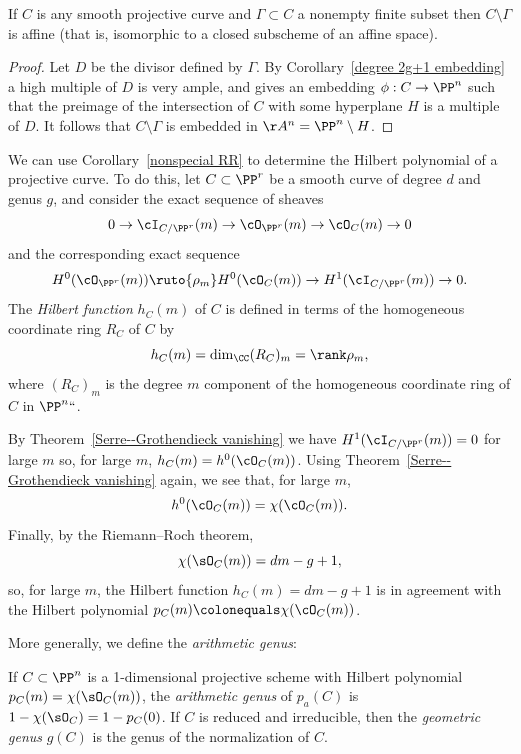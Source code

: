 \begin{corollary}
 If $C$ is any smooth projective curve and $\Gamma \subset C$ a nonempty finite subset then $C \setminus \Gamma$ is affine (that
 is, isomorphic to a closed subscheme of an affine space).
\end{corollary}

\begin{proof}
Let $D$ be the divisor defined by $\Gamma$. By Corollary~\ref{degree 2g+1 embedding} a high multiple of $D$ is very ample,
and gives an embedding $\phi: C\to \PP^n$ such that the preimage of the intersection of $C$ with some hyperplane $H$
is a multiple of $D$. It follows that $C\setminus \Gamma$ is embedded in $\AA^n = \PP^n\setminus H$.
\end{proof}
 
We can  use Corollary~\ref{nonspecial RR} to determine the Hilbert polynomial of a projective curve. To do this, let $C \subset \PP^r$ be a smooth curve of degree $d$ and genus $g$, and consider the exact sequence of sheaves
$$
0 \to \cI_{C/\PP^r}(m) \to \cO_{\PP^r}(m) \to \cO_C(m) \to 0
$$
and the corresponding exact sequence
$$
 H^0(\cO_{\PP^r}(m)) \ruto{\rho_m} H^0(\cO_C(m)) \to H^1(\cI_{C/\PP^r}(m)) \to 0.
$$
The \emph{Hilbert function} $h_C(m)$ of $C$  is defined in terms of the
%
homogeneous coordinate ring $R_{C}$ of $C$ by
$$
h_C(m) = \dim_{\CC} (R_{C})_{m} = \rank \rho_m,
$$
where $(R_{C})_{m}$ is the degree $m$ component of the homogeneous coordinate ring of $C$ in $\PP^n` `$.

By Theorem~\ref{Serre--Grothendieck vanishing} we have
$H^1(\cI_{C/\PP^r}(m)) = 0$ for large $m$ so, for large $m$,
$h_{C}(m) =  h^0(\cO_C(m))$. Using 
Theorem~\ref{Serre--Grothendieck vanishing} again, we see that, for large $m$, 
$$
h^0(\cO_C(m)) = \chi(\cO_C(m)).
$$
Finally, by the Riemann--Roch theorem,
$$
\chi (\sO_{C}(m)) = dm-g+1,
$$ 
so, for large $m$, the Hilbert function $h_{C}(m) = dm-g+1$ is in agreement
with the Hilbert polynomial $p_{C}(m) \colonequals \chi(\cO_{C}(m))$.

More generally, we define the \emph{arithmetic genus}:
%
%

\begin{definition}\label{genus Hilbert}\label{pa}\label{genus formula}
If $C\subset \PP^n$ is a 1-dimensional projective scheme with Hilbert polynomial
$p_C(m) = \chi(\sO_C(m))$, the \emph{arithmetic genus} of $p_a(C)$ is $1-\chi(\sO_{C}) = 1-p_C(0)$. If $C$ is reduced and irreducible, then
the \emph{geometric genus} $g(C)$ is the genus of the normalization of $C$.
\end{definition}

